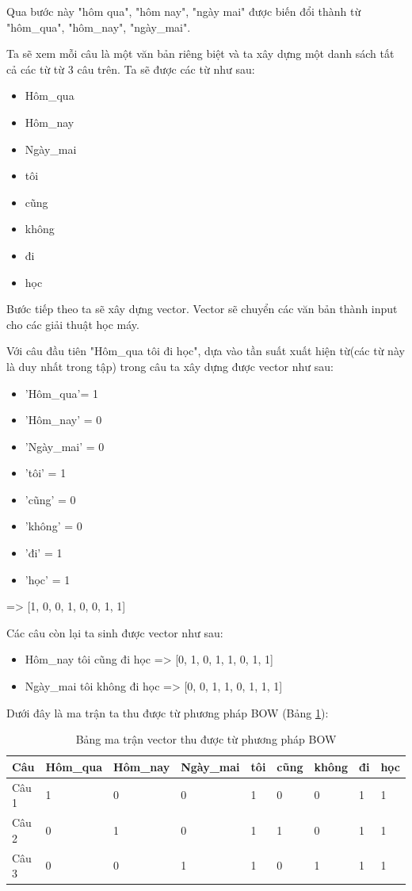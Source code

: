 Qua bước này "hôm qua", "hôm nay", "ngày mai" được biến đổi thành từ "hôm\_qua", "hôm\_nay", "ngày\_mai".

Ta sẽ xem mỗi câu là một văn bản riêng biệt và ta xây dựng một danh sách tất cả các từ từ 3 câu trên. Ta sẽ được các từ như sau: 
\begin{itemize}
    \item Hôm\_qua
    \item Hôm\_nay
    \item Ngày\_mai
    \item tôi
    \item cũng
    \item không
    \item đi
    \item học
\end{itemize}

Bước tiếp theo ta sẽ xây dựng vector. Vector sẽ chuyển các văn bản thành input cho các giải thuật học máy.

Với câu đầu tiên "Hôm\_qua tôi đi học", dựa vào tần suất xuất hiện từ(các từ này là duy nhất trong tập) trong câu ta xây dựng được vector như sau:
\begin{itemize}
   \item 'Hôm\_qua'= 1
    \item 'Hôm\_nay' = 0
    \item 'Ngày\_mai' = 0
    \item 'tôi' = 1
    \item 'cũng' = 0
    \item 'không' = 0
    \item 'đi' = 1
    \item 'học' = 1
\end{itemize}

=> [1, 0, 0, 1, 0, 0, 1, 1]

Các câu còn lại ta sinh được vector như sau:
\begin{itemize}
    \item Hôm\_nay tôi cũng đi học => [0, 1, 0, 1, 1, 0, 1, 1]
    \item Ngày\_mai tôi không đi học => [0, 0, 1, 1, 0, 1, 1, 1]
\end{itemize}

Dưới đây là ma trận ta thu được từ phương pháp BOW (Bảng \ref{tab:bow_vector}):

\begin{table}[h!]
\centering
\begin{tabular}{|l|l|l|l|l|l|l|l|l|}
\hline
Câu & Hôm\_qua & Hôm\_nay   & Ngày\_mai & tôi    & cũng   & không   & đi   & học \\ \hline
Câu 1     & 1     & 0 & 0  & 1    & 0    & 0 & 1 & 1 \\ \hline
Câu 2     & 0     & 1    & 0  & 1 & 1 & 0    & 1    & 1    \\ \hline
Câu 3     & 0     & 0 & 1     & 1 & 0 & 1    & 1    & 1   \\ \hline
\end{tabular}
\caption{Bảng ma trận vector thu được từ phương pháp BOW}
\label{tab:bow_vector}
\end{table}

